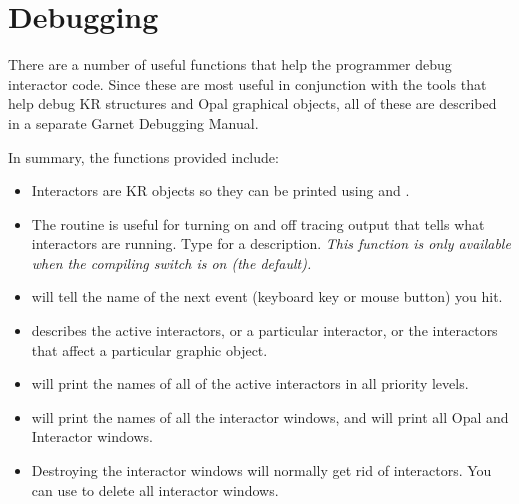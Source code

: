 \chapter{Debugging}

There are a number of useful functions that help the programmer debug
interactor code.  Since these are most useful in conjunction with the tools
that help debug KR structures and Opal graphical objects, all of these are
described in a separate Garnet Debugging Manual.

In summary, the functions provided include:

\begin{itemize}
\item {}
Interactors are KR objects so they can be printed using
 and .

\item {}
The  routine is
useful for turning on and off tracing output that tells what interactors
are running.  Type  for a description.
{\it This function is only available when the  compiling
switch is on (the default).}

\item {}
 will tell the name of the next event
(keyboard key or mouse button) you hit.

\item {}
 describes the active
interactors, or a particular interactor, or the interactors that affect a
particular graphic object.

\item {}
will print the names of all of the active interactors in all priority levels.

\item {}
 will print the names of all the interactor
windows, and  will print all Opal and Interactor
windows.

\item {}
Destroying the interactor windows will normally get rid of interactors.
You can use  to delete all interactor windows.


\end{itemize}
